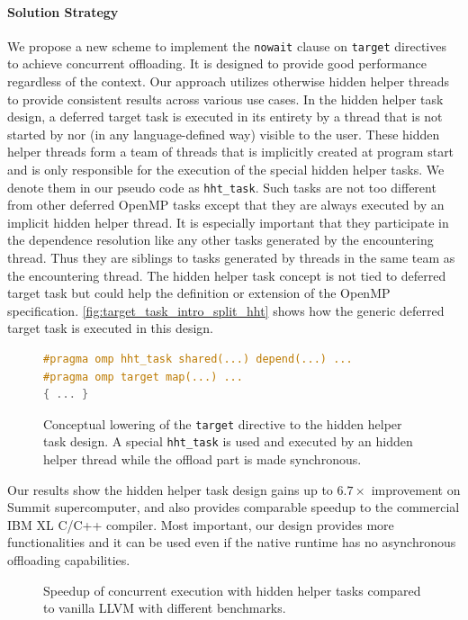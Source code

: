 \paragraph{Solution Strategy}
We propose a new scheme to implement the \texttt{nowait} clause on \texttt{target} directives to achieve concurrent offloading.
It is designed to provide good performance regardless of the context.
Our approach utilizes otherwise hidden helper threads to provide consistent results across various use cases.
In the hidden helper task design, a deferred target task is executed in its entirety by a thread that is not started by nor (in any language-defined way) visible to the user.
These hidden helper threads form a team of threads that is implicitly created at program start and is only responsible for the execution of the special hidden helper tasks.
We denote them in our pseudo code as \texttt{hht\_task}.
Such tasks are not too different from other deferred OpenMP tasks except that they are always executed by an implicit hidden helper thread.
It is especially important that they participate in the dependence resolution like any other tasks generated by the encountering thread.
Thus they are siblings to tasks generated by threads in the same team as the encountering thread.
The hidden helper task concept is not tied to deferred target task but could help the definition or extension of the OpenMP specification.
\autoref{fig:target_task_intro_split_hht} shows how the generic deferred target task is executed in this design.

\begin{figure}[H]
\begin{lstlisting}[language=C++]
#pragma omp hht_task shared(...) depend(...) ...
#pragma omp target map(...) ...
{ ... }
\end{lstlisting}
\caption{Conceptual lowering of the \texttt{target} directive to the hidden helper task design.
A special \texttt{hht\_task} is used and executed by an hidden helper thread while the offload part is made synchronous.}
\label{fig:target_task_intro_split_hht}
\end{figure}

Our results show the hidden helper task design gains up to $6.7\times$ improvement on Summit supercomputer, and also provides comparable speedup to the commercial IBM XL C/C++ compiler. Most important, our design provides more functionalities and it can be used even if the native runtime has no asynchronous offloading capabilities.

\begin{figure}[hbt!]
\centering
\subfloat[]{\resizebox{0.45\textwidth}{!}{}}
\subfloat[]{\resizebox{0.45\textwidth}{!}{}}
\caption[]{Speedup of concurrent execution with hidden helper tasks compared to vanilla LLVM with different benchmarks.}
\label{fig:speedup-nw-vanilla}
\end{figure}

